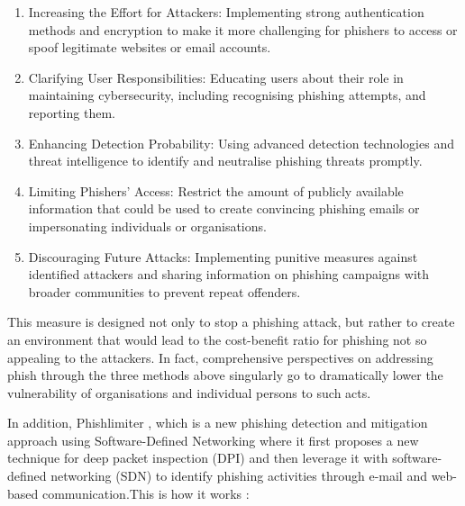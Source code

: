 \begin{enumerate}
    \item Increasing the Effort for Attackers: Implementing strong authentication methods and encryption to make it more challenging for phishers to access or spoof legitimate websites or email accounts.
    \item Clarifying User Responsibilities: Educating users about their role in maintaining cybersecurity, including recognising phishing attempts, and reporting them.
    \item Enhancing Detection Probability: Using advanced detection technologies and threat intelligence to identify and neutralise phishing threats promptly.
    \item Limiting Phishers' Access: Restrict the amount of publicly available information that could be used to create convincing phishing emails or impersonating individuals or organisations.
    \item Discouraging Future Attacks: Implementing punitive measures against identified attackers and sharing information on phishing campaigns with broader communities to prevent repeat offenders.
\end{enumerate}

This measure is designed not only to stop a phishing attack, but rather to create an environment that would lead to the cost-benefit ratio for phishing not so appealing to the attackers. In fact, comprehensive perspectives on addressing phish through the three methods above singularly go to dramatically lower the vulnerability of organisations and individual persons to such acts.

In addition, Phishlimiter \cite{Chin2018PhishLimiter} , which is a new phishing detection and mitigation approach using Software-Defined Networking where it first proposes a new technique for deep packet inspection (DPI) and then leverage it with software-defined networking (SDN) to identify phishing activities through e-mail and web-based communication.This is how it works :

